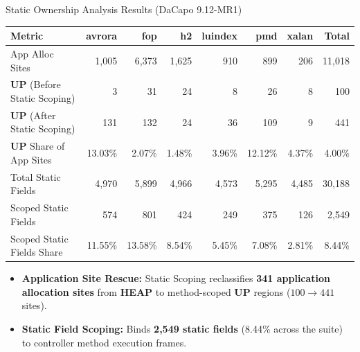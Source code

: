 \documentclass[11pt]{beamer}
\providecommand{\UP}{\textbf{UP}}
\providecommand{\HEAP}{\textbf{HEAP}}
\begin{document}
\begin{frame}{Static Ownership Analysis Results (DaCapo 9.12-MR1)}
  \vspace{-0.4em}
  \begin{table}[h]
    \centering
    \scriptsize
    \setlength{\tabcolsep}{3.8pt}
    \renewcommand{\arraystretch}{1.12}
    \begin{tabular}{lrrrrrrr}
      \toprule
      \textbf{Metric} & \textbf{avrora} & \textbf{fop} & \textbf{h2} & \textbf{luindex} & \textbf{pmd} & \textbf{xalan} & \textbf{Total} \\
      \midrule
      App Alloc Sites & 1{,}005 & 6{,}373 & 1{,}625 & 910 & 899 & 206 & 11{,}018 \\
      \UP{} (Before Static Scoping) & 3 & 31 & 24 & 8 & 26 & 8 & 100 \\
      \UP{} (After Static Scoping) & 131 & 132 & 24 & 36 & 109 & 9 & 441 \\
      \UP{} Share of App Sites & 13.03\% & 2.07\% & 1.48\% & 3.96\% & 12.12\% & 4.37\% & 4.00\% \\
      \midrule
      Total Static Fields & 4{,}970 & 5{,}899 & 4{,}966 & 4{,}573 & 5{,}295 & 4{,}485 & 30{,}188 \\
      Scoped Static Fields & 574 & 801 & 424 & 249 & 375 & 126 & 2{,}549 \\
      Scoped Static Fields Share & 11.55\% & 13.58\% & 8.54\% & 5.45\% & 7.08\% & 2.81\% & 8.44\% \\
      \bottomrule
    \end{tabular}
  \end{table}

  \vspace{-0.2em}
  \begin{itemize}\setlength{\itemsep}{2pt}
    \item \textbf{Application Site Rescue:} Static Scoping reclassifies \textbf{341 application allocation sites} from \HEAP{} to method-scoped \UP{} regions ($100 \to 441$ sites).
    \item \textbf{Static Field Scoping:} Binds \textbf{2{,}549 static fields} (8.44\% across the suite) to controller method execution frames.
  \end{itemize}
\end{frame}
\end{document}
